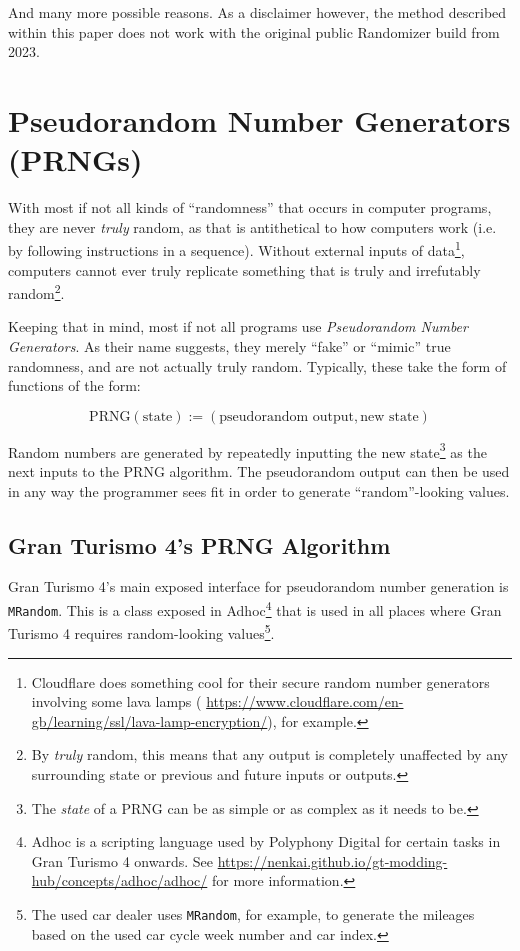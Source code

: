 \documentclass[14pt,a4paper,notitlepage]{extarticle}
\begin{document}
        \noindent And many more possible reasons. As a disclaimer however, the method described
        within this paper does not work with the original public Randomizer build from 2023.

    \section*{Pseudorandom Number Generators (PRNGs)}
        With most if not all kinds of ``randomness'' that occurs in computer programs, they are
        never \textit{truly} random, as that is antithetical to how computers work (i.e. by
        following instructions in a sequence). Without external inputs of data\footnote{
        Cloudflare does something cool for their secure random number generators
        involving some lava lamps (
        \url{https://www.cloudflare.com/en-gb/learning/ssl/lava-lamp-encryption/}),
        for example.}, computers cannot ever truly replicate something that is truly and
        irrefutably random\footnote{By \textit{truly} random, this means that any output is
        completely unaffected by any surrounding state or previous and future inputs or
        outputs.}.

        Keeping that in mind, most if not all programs use \textit{
        Pseudorandom Number Generators}. As their name suggests, they merely ``fake'' or
        ``mimic'' true randomness, and are not actually truly random. Typically, these take
        the form of functions of the form:

        \begin{equation*}
            \text{PRNG}(\text{state}) := (\text{pseudorandom output}, \text{new state})
        \end{equation*}

        Random numbers are generated by repeatedly inputting the new state\footnote{
        The \textit{state} of a PRNG can be as simple or as complex as it needs to be.} as
        the next inputs to the PRNG algorithm. The pseudorandom output can then be used in
        any way the programmer sees fit in order to generate ``random''-looking values.

        \subsection*{Gran Turismo 4's PRNG Algorithm}
            Gran Turismo 4's main exposed interface for pseudorandom number generation is
            \texttt{MRandom}. This is a class exposed in Adhoc\footnote{Adhoc is a scripting
            language used by Polyphony Digital for certain tasks in Gran Turismo 4 onwards.
            See \url{https://nenkai.github.io/gt-modding-hub/concepts/adhoc/adhoc/} for more 
            information.} that is used in all places where Gran Turismo 4 requires
            random-looking values\footnote{The used car dealer uses \texttt{MRandom}, for
            example, to generate the mileages based on the used car cycle week number and car
            index.}.
\end{document}
